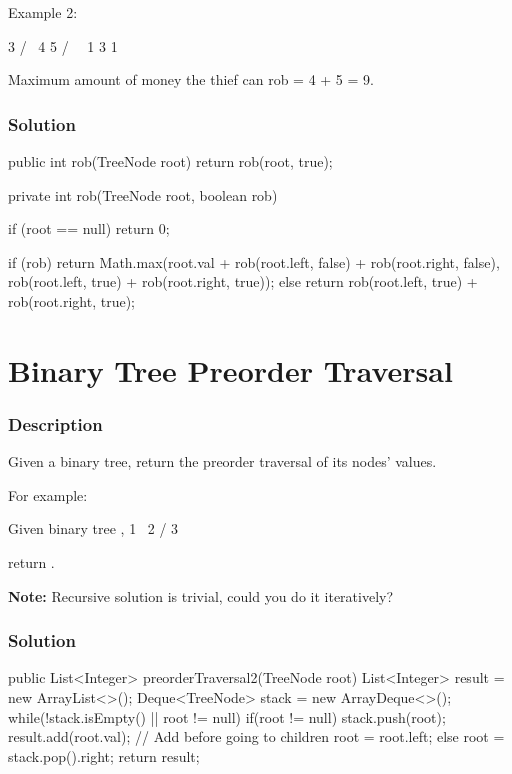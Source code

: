 Example 2:
\begin{Code}
     3
    / \
   4   5
  / \   \
 1   3   1
\end{Code}

Maximum amount of money the thief can rob = 4 + 5 = 9.

\subsubsection{Solution}

\begin{Code}
public int rob(TreeNode root) {
    return rob(root, true);
}

private int rob(TreeNode root, boolean rob) {
    if (root == null) {
        return 0;
    }

    if (rob) {
        return Math.max(root.val + rob(root.left, false) + rob(root.right, false),
                rob(root.left, true) + rob(root.right, true));
    } else {
        return rob(root.left, true) + rob(root.right, true);
    }
}
\end{Code}

\newpage

\section{Binary Tree Preorder Traversal} %

\subsubsection{Description}
Given a binary tree, return the preorder traversal of its nodes' values.

For example:
\begin{Code}
Given binary tree ,
   1
    \
     2
    /
   3
\end{Code}
return \code{[1,2,3]}.

\textbf{Note:} Recursive solution is trivial, could you do it iteratively?

\subsubsection{Solution}

\begin{Code}
public List<Integer> preorderTraversal2(TreeNode root) {
    List<Integer> result = new ArrayList<>();
    Deque<TreeNode> stack = new ArrayDeque<>();
    while(!stack.isEmpty() || root != null) {
        if(root != null) {
            stack.push(root);
            result.add(root.val);  // Add before going to children
            root = root.left;
        } else {
            root = stack.pop().right;
        }
    }
    return result;
}
\end{Code}

